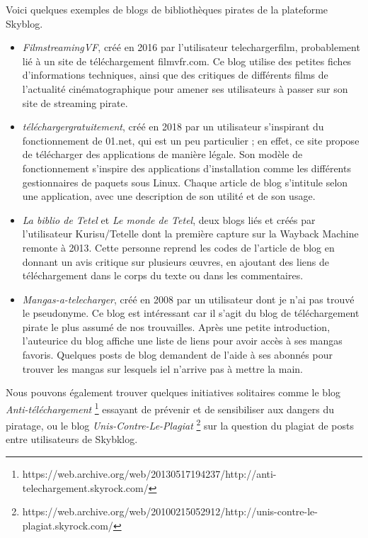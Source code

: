 Voici quelques exemples de blogs de bibliothèques pirates de la plateforme Skyblog.
\begin{itemize}
    \item \textit{FilmstreamingVF}, créé en 2016 par l'utilisateur telechargerfilm, probablement lié à un site de téléchargement filmvfr.com. Ce blog utilise des petites fiches d'informations techniques, ainsi que des critiques de différents films de l'actualité cinématographique pour amener ses utilisateurs à passer sur son site de streaming pirate.
    \item \textit{téléchargergratuitement}, créé en 2018 par un utilisateur s'inspirant du fonctionnement de 01.net,  qui est un peu particulier ; en effet, ce site propose de télécharger des applications de manière légale. Son modèle de fonctionnement s'inspire des applications d'installation comme les différents gestionnaires de paquets sous Linux. Chaque article de blog s'intitule selon une application, avec une description de son utilité et de son usage. 
    \item \textit{La biblio de Tetel} et \textit{Le monde de Tetel}, deux blogs liés et créés par l'utilisateur Kurisu/Tetelle dont la première capture sur la Wayback Machine remonte à 2013. Cette personne reprend les codes de l'article de blog en donnant un avis critique sur plusieurs œuvres, en ajoutant des liens de téléchargement dans le corps du texte ou dans les commentaires. 
    \item \textit{Mangas-a-telecharger}, créé en 2008 par un utilisateur dont je n'ai pas trouvé le pseudonyme. Ce blog est intéressant car il s'agit du blog de téléchargement pirate le plus assumé de nos trouvailles. Après une petite introduction, l'auteurice du blog affiche une liste de liens pour avoir accès à ses mangas favoris. Quelques posts de blog demandent de l'aide à ses abonnés pour trouver les mangas sur lesquels iel n'arrive pas à mettre la main. 
\end{itemize}

Nous pouvons également trouver quelques initiatives solitaires comme le blog \textit{Anti-téléchargement} \footnote{https://web.archive.org/web/20130517194237/http://anti-telechargement.skyrock.com/} essayant de prévenir et de sensibiliser aux dangers du piratage, ou le blog \textit{Unis-Contre-Le-Plagiat} \footnote{https://web.archive.org/web/20100215052912/http://unis-contre-le-plagiat.skyrock.com/} sur la question du plagiat de posts entre utilisateurs de Skybklog. \\

